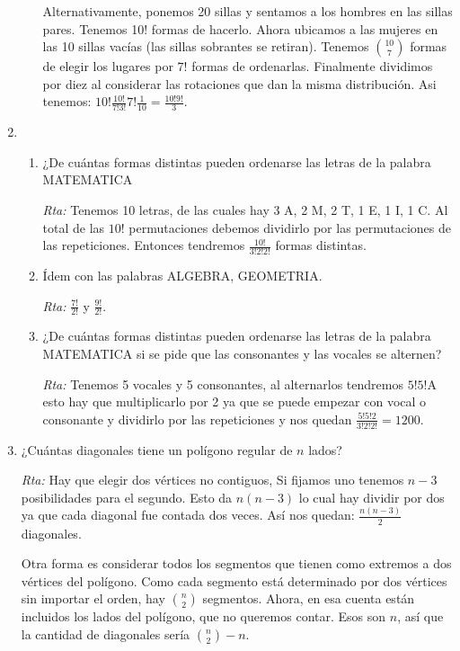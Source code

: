 \documentclass[12pt,spanish,makeidx]{amsbook}
\begin{document}
\begin{enumerate}
\begin{enumerate}
 Alternativamente, ponemos 20 sillas y sentamos a los hombres en las sillas pares. Tenemos 10! formas de hacerlo. Ahora ubicamos a las mujeres en las 10 sillas vacías (las sillas sobrantes se retiran). Tenemos $\binom{10}{7}$ formas de elegir los lugares por $7!$ formas de ordenarlas. Finalmente dividimos por diez al considerar las rotaciones que dan la misma distribución. Asi tenemos: $10! \frac{10!}{7!3!} 7!\frac{1}{10}=\frac{10!9!}{3}$.

\end{enumerate}

\medskip

\item 
\begin{enumerate}
\item 
 ¿De cuántas formas distintas pueden ordenarse las letras de la palabra MATEMATICA

\noindent\textit{Rta:} Tenemos 10 letras, de las cuales hay 3 A, 2 M, 2 T, 1 E, 1 I, 1 C. Al total de las $10!$ permutaciones debemos dividirlo por las permutaciones de las repeticiones. Entonces tendremos $\frac{10!}{3!2!2!}$ formas distintas.

\item Ídem con las palabras ALGEBRA, GEOMETRIA.

\noindent\textit{Rta:}  $\frac{7!}{2!}$ y $\frac{9!}{2!}$.

\item ¿De cuántas formas distintas pueden ordenarse las letras de la palabra MATEMATICA
si se pide que las consonantes y las vocales se alternen?

\noindent\textit{Rta:} Tenemos 5 vocales y 5 consonantes, al alternarlos tendremos $5!5!$A esto hay que multiplicarlo por 2 ya que se puede empezar con vocal o consonante y dividirlo por las repeticiones y nos quedan $\frac{5!5!2}{3!2!2!}=1200$.
\end{enumerate}

\medskip

\item ¿Cuántas diagonales tiene un polígono regular de $n$ lados?

\noindent\textit{Rta:} Hay que elegir dos vértices no contiguos, Si fijamos uno tenemos $n-3$ posibilidades para el segundo. Esto da $n(n-3)$ lo cual hay dividir por dos ya que cada diagonal fue contada dos veces. Así nos quedan: $ \frac{n(n-3)}{2}$ diagonales.

Otra forma es considerar todos los segmentos que tienen como extremos a dos vértices del polígono. Como cada segmento está determinado por dos vértices sin importar el orden, hay $\binom{n}{2}$ segmentos. Ahora, en esa cuenta están incluidos los lados del polígono, que no queremos contar. Esos son $n$, así que la cantidad de diagonales sería $\binom{n}{2}-n$.


\end{enumerate}
\end{document}
